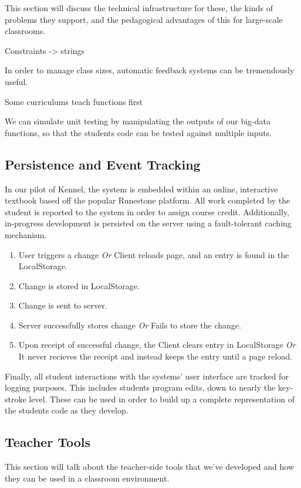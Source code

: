 \documentclass{sig-alternate}
\begin{document}
This section will discuss the technical infrastructure for these, the kinds of problems they support, and the pedagogical advantages of this for large-scale classrooms.

	Constraints -> strings
	
	In order to manage class sizes, automatic feedback systems can be tremendously useful.
	
	Some curriculums teach functions first
	
	We can simulate unit testing by manipulating the outputs of our big-data functions, so that the students code can
 be tested against multiple inputs.
	
\subsection{Persistence and Event Tracking}

In our pilot of Kennel, the system is embedded within an online, interactive textbook based off the popular Runestone platform. %
All work completed by the student is reported to the system in order to assign course credit.
Additionally, in-progress development is persisted on the server using a fault-tolerant caching mechanism.
\begin{enumerate}
  \item User triggers a change \textit{Or} Client reloads page, and an entry is found in the LocalStorage.
	\item Change is stored in LocalStorage.
	\item Change is sent to server.
  \item Server successfully stores change \textit{Or} Fails to store the change.
	\item Upon receipt of successful change, the Client clears entry in LocalStorage \textit{Or} It never recieves the receipt and instead keeps the entry until a page reload.
\end{enumerate}
Finally, all student interactions with the systems' user interface are tracked for logging purposes.
This includes students program edits, down to nearly the key-stroke level.
These can be used in order to build up a complete representation of the students code as they develop.
	
\subsection{Teacher Tools}

This section will talk about the teacher-side tools that we've developed and how they can be used in a classroom environment.
\end{document}
